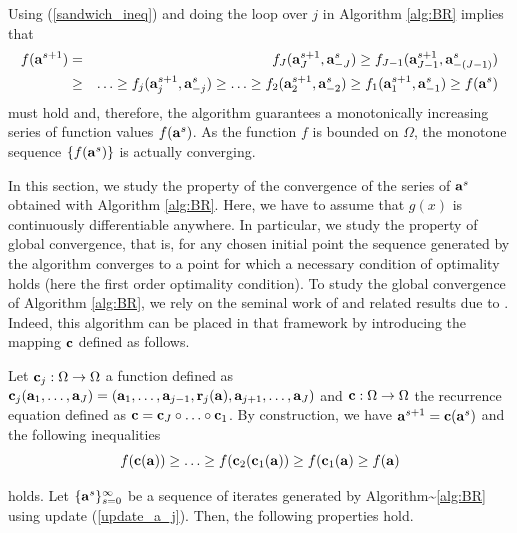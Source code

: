 \documentclass[
]{jss}
\begin{document}
Using (\ref{sandwich_ineq}) and doing the loop over \(j\) in Algorithm
\ref{alg:BR} implies that \begin{eqnarray}
\nonumber f(\mathbf{a}^{s+1}) &=&  f_{J}(\mathbf{a}_{J}^{s+1}, \mathbf{a}_{-J}^s)  
                 \geq f_{J-1}(\mathbf{a}_{J-1}^{s+1}, \mathbf{a}_{-(J-1)}^s)\\
                 &\geq&
                  \ldots 
                 \geq  f_j(\mathbf{a}_j^{s+1}, \mathbf{a}_{-j}^s)
                 \geq
                 \ldots
                 \geq  f_2(\mathbf{a}_2^{s+1}, \mathbf{a}_{-2}^s)
                 \geq  f_1(\mathbf{a}_1^{s+1}, \mathbf{a}_{-1}^s) \geq f(\mathbf{a}^{s})
\label{monotonicity}
\end{eqnarray} must hold and, therefore, the algorithm guarantees a
monotonically increasing series of function values \(f(\mathbf{a}^s)\). As
the function \(f\) is bounded on \(\Omega\), the monotone sequence
\(\{f(\mathbf{a}^s)\}\) is actually converging.

In this section, we study the property of the convergence of the series
of \(\mathbf{a}^s\) obtained with Algorithm \ref{alg:BR}. Here, we have to
assume that \(g(x)\) is continuously differentiable anywhere. In
particular, we study the property of global convergence, that is, for
any chosen initial point the sequence generated by the algorithm
converges to a point for which a necessary condition of optimality holds
(here the first order optimality condition). To study the global
convergence of Algorithm \ref{alg:BR}, we rely on the seminal work of
\citep{Zangwill1969} and related results due to \citep{Meyer1976}.
Indeed, this algorithm can be placed in that framework by introducing
the mapping \(\mathbf{c}\) defined as follows.

Let \(\mathbf{c}_j : \Omega \rightarrow \Omega\) a function defined as
\(\mathbf{c}_j(\mathbf{a}_1, \ldots, \mathbf{a}_J) = (\mathbf{a}_1, \ldots, \mathbf{a}_{j-1}, \mathbf{r}_j(\mathbf{a}), \mathbf{a}_{j+1}, \ldots, \mathbf{a}_{J})\)
and \(\mathbf{c} : \Omega \rightarrow \Omega\) the recurrence equation
defined as \(\mathbf{c} = \mathbf{c}_J \circ \ldots \circ \mathbf{c}_1\). By
construction, we have \(\mathbf{a}^{s+1} = \mathbf{c}(\mathbf{a}^s)\) and the following
inequalities \begin{equation}
f(\mathbf{c}(\mathbf{a})) \geq \ldots \geq f(\mathbf{c}_2(\mathbf{c}_1(\mathbf{a})) \geq f(\mathbf{c}_1(\mathbf{a}) \geq f(\mathbf{a})
\label{monotonicity_c}
\end{equation}

holds. Let \(\{\mathbf{a}^s\}_{s=0}^{\infty}\) be a sequence of iterates
generated by Algorithm\textasciitilde{}\ref{alg:BR} using update
(\ref{update_a_j}). Then, the following properties hold.
\end{document}
